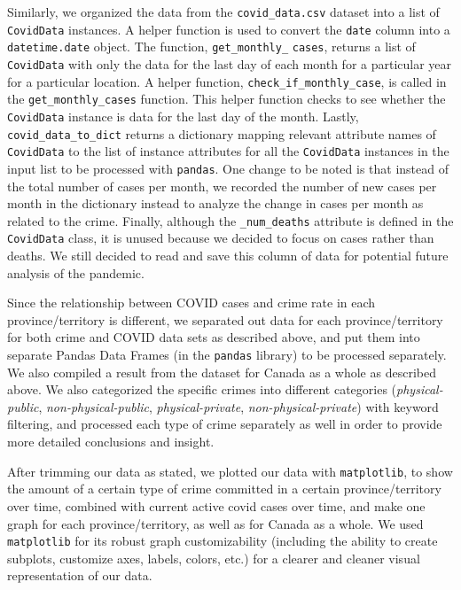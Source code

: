 \documentclass[fontsize=11pt]{article}
\begin{document}
Similarly, we organized the data from the \verb+covid_data.csv+ dataset into a list of \verb+CovidData+ instances. A helper function is used to convert the \verb+date+ column into a \verb+datetime.date+ object. The function, \verb+get_monthly_+ \verb+cases+, returns a list of \verb+CovidData+ with only the data for the last day of each month for a particular year for a particular location. A helper function, \verb+check_if_monthly_case+, is called in the \verb+get_monthly_cases+ function. This helper function checks to see whether the \verb+CovidData+ instance is data for the last day of the month. Lastly, \verb+covid_data_to_dict+ returns a dictionary mapping relevant attribute names of \verb+CovidData+ to the list of instance attributes for all the \verb+CovidData+ instances in the input list to be processed with \verb+pandas+. One change to be noted is that instead of the total number of cases per month, we recorded the number of new cases per month in the dictionary instead to analyze the change in cases per month as related to the crime. Finally, although the \verb+_num_deaths+ attribute is defined in the \verb+CovidData+ class, it is unused because we decided to focus on cases rather than deaths. We still decided to read and save this column of data for potential future analysis of the pandemic.

Since the relationship between COVID cases and crime rate in each province/territory is different, we separated out data for each province/territory for both crime and COVID data sets as described above, and put them into separate Pandas Data Frames (in the \verb+pandas+ library) to be processed separately. We also compiled a result from the dataset for Canada as a whole as described above. We also categorized the specific crimes into different categories (\textit{physical-public}, \textit{non-physical-public}, \textit{physical-private}, \textit{non-physical-private}) with keyword filtering, and processed each type of crime separately as well in order to provide more detailed conclusions and insight.

After trimming our data as stated, we plotted our data with \verb+matplotlib+, to show the amount of a certain type of crime committed in a certain province/territory over time, combined with current active covid cases over time, and make one graph for each province/territory, as well as for Canada as a whole. We used \verb+matplotlib+ for its robust graph customizability (including the ability to create subplots, customize axes, labels, colors, etc.) for a clearer and cleaner visual representation of our data.
\end{document}

